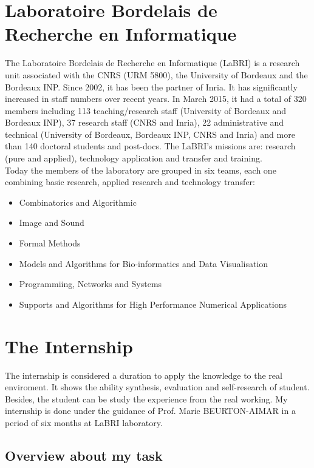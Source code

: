 \section{Laboratoire Bordelais de Recherche en Informatique}
The Laboratoire Bordelais de Recherche en Informatique (LaBRI) is a research unit associated with the CNRS (URM 5800), the University of Bordeaux and the Bordeaux INP. Since 2002, it has been the partner of Inria. It has significantly increased in staff numbers over recent years. In March 2015, it had a total of 320 members including 113 teaching/research staff (University of Bordeaux and Bordeaux INP), 37 research staff (CNRS and Inria), 22 administrative and technical (University of Bordeaux, Bordeaux INP, CNRS and Inria) and more than 140 doctoral students and post-docs. The LaBRI's missions are: research (pure and applied), technology application and transfer and training.\\
Today the members of the laboratory are grouped in six teams, each one combining basic research, applied research and technology transfer:
\begin{itemize}
\item Combinatorics and Algorithmic
\item Image and Sound
\item Formal Methods
\item Models and Algorithms for Bio-informatics and Data Visualisation
\item Programmiing, Networks and Systems
\item Supports and Algorithms for High Performance Numerical Applications
\end{itemize}

\section{The Internship}
The internship is considered a duration to apply the knowledge to the real enviroment. It shows the ability synthesis, evaluation and self-research of student. Besides, the student can be study the experience from the real working. My internship is done under the guidance of Prof. Marie BEURTON-AIMAR in a period of six months at LaBRI laboratory.
\subsection{Overview about my task}

